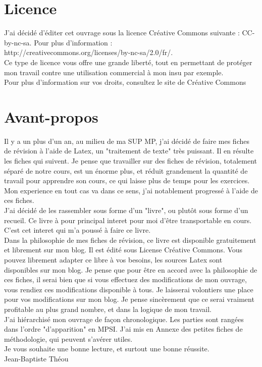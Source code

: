 \documentclass[a4paper, titlepage, draft,twoside]{book}
\begin{document}
\pagestyle{empty}
\titleGMPHY
\clearpage
\frontmatter                  %
\chapter{Licence}
J'ai décidé d'éditer cet ouvrage sous la licence Créative Commons suivante : CC-by-nc-sa. Pour plus d'information :\\
http://creativecommons.org/licenses/by-nc-sa/2.0/fr/.\\
Ce type de licence vous offre une grande liberté, tout en permettant de protéger mon travail contre une utilisation commercial à mon insu par exemple.\\
Pour plus d'information sur vos droits, consultez le site de Créative Commons
\chapter{Avant-propos}
Il y a un plus d'un an, au milieu de ma SUP MP, j'ai décidé de faire mes fiches de révision à l'aide de Latex, un "traitement de texte" très puissant. Il en résulte les fiches qui suivent. Je pense que travailler sur des fiches de révision, totalement séparé de notre cours, est un énorme plus, et réduit grandement la quantité de travail pour apprendre son cours, ce qui laisse plus de temps pour les exercices. Mon experience en tout cas va dans ce sens, j'ai notablement progressé à l'aide de ces fiches.\\
J'ai décidé de les rassembler sous forme d'un "livre", ou plutôt sous forme d'un recueil. Ce livre à pour principal interet pour moi d'être transportable en cours. C'est cet interet qui m'a poussé à faire ce livre.\\
Dans la philosophie de mes fiches de révision, ce livre est disponible gratuitement et librement sur mon blog. Il est édité sous License Créative Commons. Vous pouvez librement adapter ce libre à vos besoins, les sources Latex sont disponibles sur mon blog. Je pense que pour être en accord avec la philosophie de ces fiches, il serai bien que si vous effectuez des modifications de mon ouvrage, vous rendiez ces modifications disponible à tous. Je laisserai volontiers une place pour vos modifications sur mon blog. Je pense sincèrement que ce serai vraiment profitable au plus grand nombre, et dans la logique de mon travail.\\
J'ai hiérarchisé mon ouvrage de façon chronologique. Les parties sont rangées dans l'ordre "d'apparition" en MPSI. J'ai mis en Annexe des petites fiches de méthodologie, qui peuvent s'avérer utiles.\\
Je vous souhaite une bonne lecture, et surtout une bonne réussite.\\
Jean-Baptiste Théou
\end{document}

